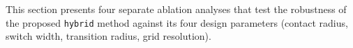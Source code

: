 This section presents four separate ablation analyses that test the robustness of the proposed \texttt{hybrid} method against its four design parameters (contact radius, switch width, transition radius, grid resolution).
